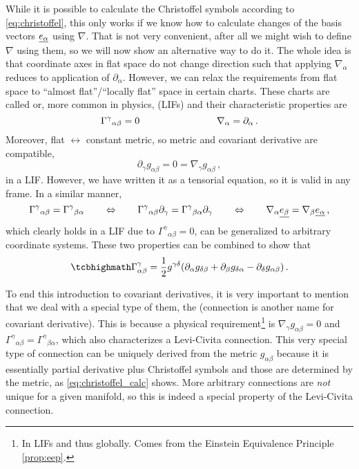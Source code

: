 \documentclass[../relativity_main.tex]{subfiles}
\begin{document}
While it is possible to calculate the Christoffel symbols according to \eqref{eq:christoffel}, this only works if we know how to calculate changes of the basis vectors $\underline{e_\alpha}$ using $\nabla$. That is not very convenient, after all we might wish to define $\nabla$ using them, so we will now show an alternative way to do it. The whole idea is that coordinate axes in flat space do not change direction such that applying $\nabla_\alpha$ reduces to application of $\partial_\alpha$. However, we can relax the requirements from flat space to \enquote{almost flat}/\enquote{locally flat} space in certain charts. These charts are called  or, more common in physics,  (LIFs) and their characteristic properties are
\begin{equation}
\Gamma^\gamma{}_{\alpha \beta} = 0
\qquad \qquad \qquad \qquad
\nabla_\alpha = \partial_\alpha
\, .
\end{equation}
Moreover, flat $\leftrightarrow$ constant metric, so metric and covariant derivative are compatible,
\begin{equation}
\partial_\gamma g_{\alpha \beta} = 0 = \nabla_\gamma g_{\alpha \beta} \, ,
\end{equation}
in a LIF. However, we have written it as a tensorial equation, so it is valid in any frame. In a similar manner,
\begin{equation}
\Gamma^\gamma{}_{\alpha \beta} = \Gamma^\gamma{}_{\beta \alpha}
\qquad \Leftrightarrow \qquad
\Gamma^\gamma{}_{\alpha \beta} \partial_\gamma = \Gamma^\gamma{}_{\beta \alpha} \partial_\gamma
\qquad \Leftrightarrow \qquad
\nabla_\alpha \underline{e_\beta} = \nabla_\beta \underline{e_\alpha}
\, ,
\end{equation}
which clearly holds in a LIF due to $\Gamma^\gamma{}_{\alpha \beta} = 0$, can be generalized to arbitrary coordinate systems. These two properties can be combined to show that
\begin{equation}\label{eq:christoffel_calc}
\eqbox{
\Gamma^\gamma_{\alpha \beta} = \frac{1}{2} g^{\gamma \delta} \qty(\partial_\alpha g_{\delta \beta} + \partial_\beta g_{\delta \alpha} - \partial_\delta g_{\alpha \beta})
} \, .
\end{equation}


To end this introduction to covariant derivatives, it is very important to mention that we deal with a special type of them, the  (connection is another name for covariant derivative). This is because a physical requirement\footnote{In LIFs and thus globally. Comes from the Einstein Equivalence Principle \ref{prop:eep}.} is $\nabla_\gamma g_{\alpha \beta} = 0$ and $\Gamma^\gamma{}_{\alpha \beta} = \Gamma^\gamma{}_{\beta \alpha}$, which also characterizes a Levi-Civita connection. This very special type of connection can be uniquely derived from the metric $g_{\alpha \beta}$ because it is essentially partial derivative plus Christoffel symbols and those are determined by the metric, as \eqref{eq:christoffel_calc} shows. More arbitrary connections are \emph{not} unique for a given manifold, so this is indeed a special property of the Levi-Civita connection.
\end{document}

